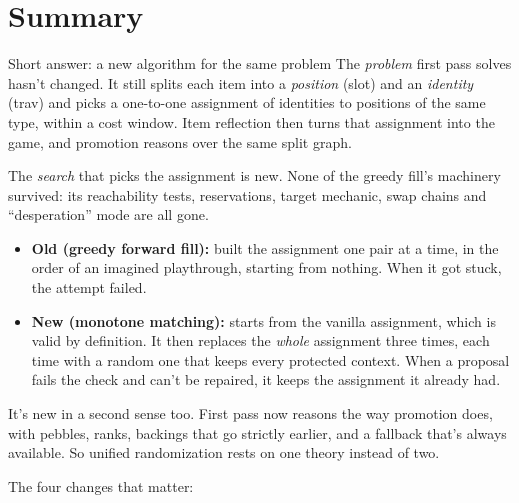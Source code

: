 \section*{Summary}

\begin{keybox}{Short answer: a new algorithm for the same problem}
The \emph{problem} first pass solves hasn't changed. It still splits each item into a \emph{position} (slot) and an \emph{identity} (trav) and picks a one-to-one assignment of identities to positions of the same type, within a cost window. Item reflection then turns that assignment into the game, and promotion reasons over the same split graph.

The \emph{search} that picks the assignment is new. None of the greedy fill's machinery survived: its reachability tests, reservations, target mechanic, swap chains and ``desperation'' mode are all gone.
\begin{itemize}
  \item \textbf{Old (greedy forward fill):} built the assignment one pair at a time, in the order of an imagined playthrough, starting from nothing. When it got stuck, the attempt failed.
  \item \textbf{New (monotone matching):} starts from the vanilla assignment, which is valid by definition. It then replaces the \emph{whole} assignment three times, each time with a random one that keeps every protected context. When a proposal fails the check and can't be repaired, it keeps the assignment it already had.
\end{itemize}
It's new in a second sense too. First pass now reasons the way promotion does, with pebbles, ranks, backings that go strictly earlier, and a fallback that's always available. So unified randomization rests on one theory instead of two.
\end{keybox}

\medskip
\noindent The four changes that matter:

